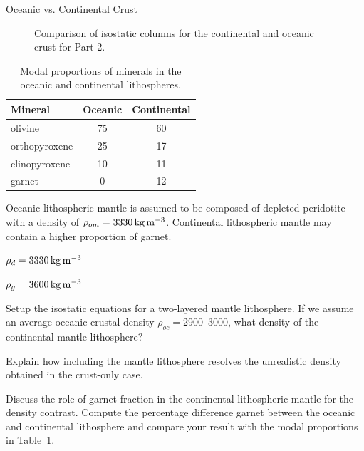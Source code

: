 \begin{activity}{Oceanic vs. Continental Crust}
\begin{figure}[h!]
\begin{tikzpicture}[scale=0.1]
    \end{tikzpicture}
    \caption{Comparison of isostatic columns for the continental and oceanic crust for Part 2.}
    \label{fig:part2}
\end{figure}

\begin{table}[h!]
    \centering
    \caption{Modal proportions of minerals in the oceanic and continental lithospheres.}
    \label{tab:modes}
    \begin{tabular}{lcc}
        \toprule
        \textbf{Mineral} &
        \textbf{Oceanic} &
        \textbf{Continental} \\
        \midrule
        olivine & 75 & 60 \\
        orthopyroxene & 25 & 17 \\
        clinopyroxene & 10 & 11 \\
        garnet & 0 & 12 \\
        \bottomrule
    \end{tabular}
\end{table}
\FloatBarrier

Oceanic lithospheric mantle is assumed to be composed of depleted peridotite with a density of \(\rho_{om} = \SI{3330}{\du}\). Continental lithospheric mantle may contain a higher proportion of garnet.

\begin{description}[itemsep=0.0em, topsep=0.5em]
    \item [Density of depleted mantle (peridotite):] \(\rho_d = \SI{3330}{\du}\)
    \item [Density of garnet:] \(\rho_g = \SI{3600}{\du}\)
\end{description}

\begin{questions}[resume]
    Setup the isostatic equations for a two-layered mantle lithosphere.  If we assume an average oceanic crustal density $\rho_{oc} = $2900--\SI{3000}{\du}, what density of the continental mantle lithosphere?
    \answerbox[8cm]

    Explain how including the mantle lithosphere resolves the unrealistic density obtained in the crust-only case.
    \answerbox[4cm]

    Discuss the role of garnet fraction in the continental lithospheric mantle for the density contrast. Compute the percentage difference garnet between the oceanic and continental lithosphere and compare your result with the modal proportions in Table~\ref{tab:modes}.
    \answerbox[5cm]
\end{questions}


\end{activity}
